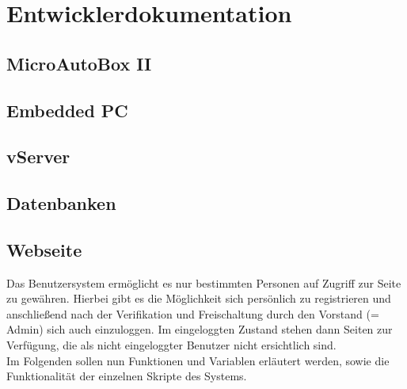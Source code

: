 \documentclass[fontsize = 12pt, paper = a4]{scrreprt}
\begin{document}

\chapter{Entwicklerdokumentation}




\section{MicroAutoBox II}


\section{Embedded PC}


\section{vServer}


\section{Datenbanken}


\section{Webseite}

Das Benutzersystem ermöglicht es nur bestimmten Personen auf Zugriff zur Seite zu gewähren. Hierbei gibt es die Möglichkeit sich persönlich zu registrieren und anschließend nach der Verifikation und Freischaltung durch den Vorstand (= Admin) sich auch einzuloggen. Im eingeloggten Zustand stehen dann Seiten zur Verfügung, die als nicht eingeloggter Benutzer nicht ersichtlich sind.\\

Im Folgenden sollen nun Funktionen und Variablen erläutert werden, sowie die Funktionalität der einzelnen Skripte des Systems.
\end{document}
